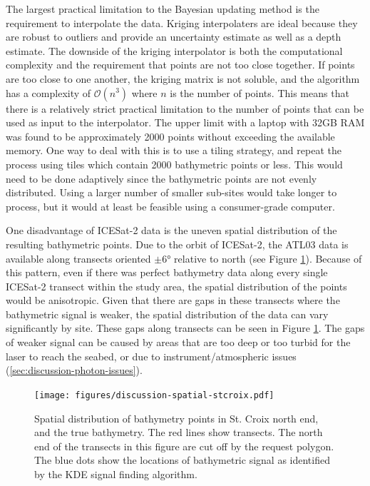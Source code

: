 The largest practical limitation to the Bayesian updating method is the requirement to interpolate the data. Kriging interpolaters are ideal because they are robust to outliers and provide an uncertainty estimate as well as a depth estimate. The downside of the kriging interpolator is both the computational complexity and the requirement that points are not too close together. If points are too close to one another, the kriging matrix is not soluble, and the algorithm has a complexity of $\mathcal{O}(n^3)$ where $n$ is the number of points. This means that there is a relatively strict practical limitation to the number of points that can be used as input to the interpolator. The upper limit with a laptop with 32GB RAM was found to be approximately 2000 points without exceeding the available memory. One way to deal with this is to use a tiling strategy, and repeat the process using tiles which contain 2000 bathymetric points or less. This would need to be done adaptively since the bathymetric points are not evenly distributed. Using a larger number of smaller sub-sites would take longer to process, but it would at least be feasible using a consumer-grade computer.

One disadvantage of ICESat-2 data is the uneven spatial distribution of the resulting bathymetric points. Due to the orbit of ICESat-2, the ATL03 data is available along transects oriented $\pm \ang{6}$ relative to north (see Figure \ref{fig:distribution-of-bathy-points-in-space}). Because of this pattern, even if there was perfect bathymetry data along every single ICESat-2 transect within the study area, the spatial distribution of the points would be anisotropic. Given that there are gaps in these transects where the bathymetric signal is weaker, the spatial distribution of the data can vary significantly by site. These gaps along transects can be seen in Figure \ref{fig:distribution-of-bathy-points-in-space}. The gaps of weaker signal can be caused by areas that are too deep or too turbid for the laser to reach the seabed, or due to instrument/atmospheric issues (\ref{sec:discussion-photon-issues}). 


\begin{figure}
    \centering
    \texttt{[image: figures/discussion-spatial-stcroix.pdf]}
    \caption{Spatial distribution of bathymetry points in St. Croix north end, and the true bathymetry. The red lines show transects. The north end of the transects in this figure are cut off by the request polygon. The blue dots show the locations of bathymetric signal as identified by the KDE signal finding algorithm.}
    \label{fig:distribution-of-bathy-points-in-space}
\end{figure}

